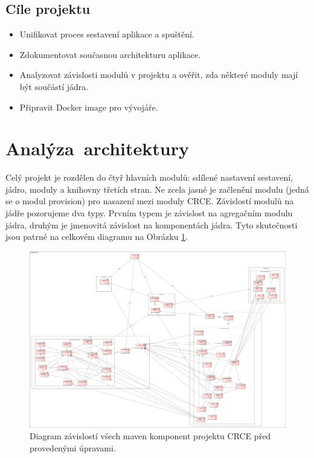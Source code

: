 \documentclass[12pt, a4paper]{article}
\begin{document}
\subsection{Cíle projektu}

\begin{itemize}
	\item Unifikovat proces sestavení aplikace a spuštění.
	\item Zdokumentovat současnou architekturu aplikace.
	\item Analyzovat závislosti modulů v projektu a ověřit, zda některé moduly mají být součástí jádra.
	\item Připravit Docker image pro vývojáře.
\end{itemize}

\newpage
\section{Analýza~architektury} %

Celý projekt je rozdělen do čtyř hlavních modulů: sdílené nastavení sestavení, jádro, moduly a knihovny třetích stran. Ne zcela jasné je začlenění modulu (jedná se o modul provision) pro nasazení mezi moduly CRCE. Závislostí modulů na jádře pozorujeme dva typy. Prvním typem je závislost na agregačním modulu jádra, druhým je jmenovitá závislost na komponentách jádra. Tyto skutečnosti jsou patrné na celkovém diagramu na Obrázku \ref{fig:wholeCRCE}.

\begin{figure}[h!]
\centering
\includegraphics[width=135mm]{wholeCRCE.png}
\caption{Diagram závislostí všech maven komponent projektu CRCE před provedenými úpravami.}
\label{fig:wholeCRCE}
\end{figure}
\end{document}

